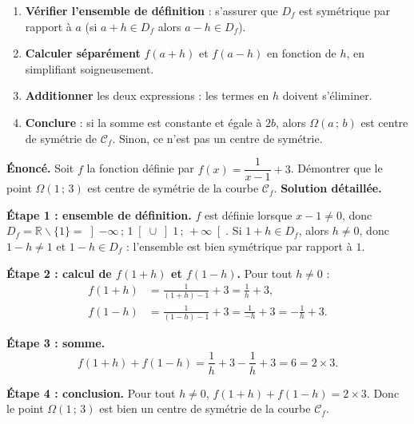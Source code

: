 \documentclass[11pt]{article}
\def\setminus{\mathbin{\backslash}}\let\smallsetminus\setminus
\begin{document}
\begin{methode}
\begin{enumerate}
\item \textbf{Vérifier l'ensemble de définition} : s'assurer que $D_f$ est symétrique par rapport à $a$ (si $a + h \in D_f$ alors $a - h \in D_f$).
\item \textbf{Calculer séparément} $f(a + h)$ et $f(a - h)$ en fonction de $h$, en simplifiant soigneusement.
\item \textbf{Additionner} les deux expressions : les termes en $h$ doivent s'éliminer.
\item \textbf{Conclure} : si la somme est constante et égale à $2b$, alors $\Omega(a\,;\,b)$ est centre de symétrie de $\mathcal{C}_f$. Sinon, ce n'est pas un centre de symétrie.
\end{enumerate}
\end{methode}

\begin{exoresolu}[Centre de symétrie de la courbe de $f(x) = \dfrac{1}{x-1} + 3$]
\textbf{Énoncé.} Soit $f$ la fonction définie par $f(x) = \dfrac{1}{x-1} + 3$. Démontrer que le point $\Omega(1\,;\,3)$ est centre de symétrie de la courbe $\mathcal{C}_f$.
\tcblower
\textbf{Solution détaillée.}

\textbf{Étape 1 : ensemble de définition.} $f$ est définie lorsque $x - 1 \neq 0$, donc $D_f = \mathbb{R} \setminus \{1\} = \left]-\infty\,;\,1\right[ \cup \left]1\,;\,+\infty\right[$. Si $1 + h \in D_f$, alors $h \neq 0$, donc $1 - h \neq 1$ et $1 - h \in D_f$ : l'ensemble est bien symétrique par rapport à $1$.

\textbf{Étape 2 : calcul de $f(1+h)$ et $f(1-h)$.} Pour tout $h \neq 0$ :
\begin{align*}
f(1 + h) &= \frac{1}{(1+h) - 1} + 3 = \frac{1}{h} + 3, \\
f(1 - h) &= \frac{1}{(1-h) - 1} + 3 = \frac{1}{-h} + 3 = -\frac{1}{h} + 3.
\end{align*}

\textbf{Étape 3 : somme.}
\[ f(1+h) + f(1-h) = \frac{1}{h} + 3 - \frac{1}{h} + 3 = 6 = 2 \times 3. \]

\textbf{Étape 4 : conclusion.} Pour tout $h \neq 0$, $f(1+h) + f(1-h) = 2 \times 3$. Donc le point $\Omega(1\,;\,3)$ est bien un centre de symétrie de la courbe $\mathcal{C}_f$.
\end{exoresolu}
\end{document}

